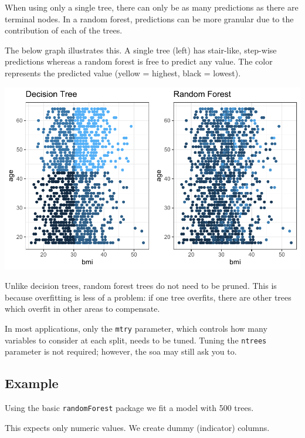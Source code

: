 \documentclass[
  openany]{book}
\begin{document}
When using only a single tree, there can only be as many predictions as there are terminal nodes. In a random forest, predictions can be more granular due to the contribution of each of the trees.

The below graph illustrates this. A single tree (left) has stair-like, step-wise predictions whereas a random forest is free to predict any value. The color represents the predicted value (yellow = highest, black = lowest).

\includegraphics{06-tree-based-models_files/figure-latex/unnamed-chunk-11-1.pdf}

Unlike decision trees, random forest trees do not need to be pruned. This is because overfitting is less of a problem: if one tree overfits, there are other trees which overfit in other areas to compensate.

In most applications, only the \texttt{mtry} parameter, which controls how many variables to consider at each split, needs to be tuned. Tuning the \texttt{ntrees} parameter is not required; however, the soa may still ask you to.

\hypertarget{example-3}{%
\subsection{Example}\label{example-3}}

Using the basic \texttt{randomForest} package we fit a model with 500 trees.

This expects only numeric values. We create dummy (indicator) columns.
\end{document}
